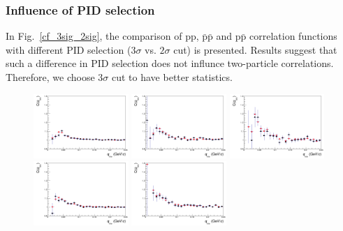 \subsubsection{Influence of PID selection}
In Fig.~\ref{cf_3sig_2sig}, the comparison of pp, $\bar{\mathrm{p}}\bar{\mathrm{p}}$ and p$\bar{\mathrm{p}}$ correlation functions with different PID selection ($3\sigma$ vs. $2\sigma$ cut) is presented. Results suggest that such a difference in PID selection does not influnce two-particle correlations. Therefore, we choose $3\sigma$ cut to have better statistics.
\begin{figure}%
  \centering
  \includegraphics[width=0.32\textwidth]{cmp_dcatpconly11h_pid_3sig_2sig_cen0/PP}
  \includegraphics[width=0.32\textwidth]{cmp_dcatpconly11h_pid_3sig_2sig_cen2/PP}
  \includegraphics[width=0.32\textwidth]{cmp_dcatpconly11h_pid_3sig_2sig_cen4/PP}
  \includegraphics[width=0.32\textwidth]{cmp_dcatpconly11h_pid_3sig_2sig_cen0/APAP}
  \includegraphics[width=0.32\textwidth]{cmp_dcatpconly11h_pid_3sig_2sig_cen2/APAP}

\end{figure}
